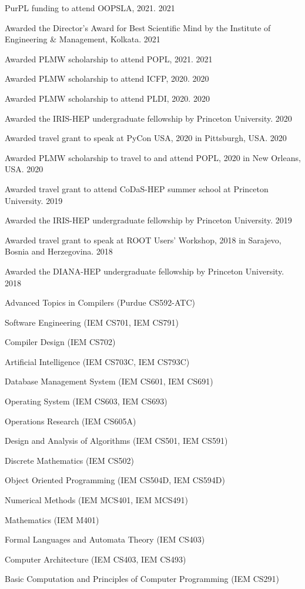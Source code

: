 \documentclass[10pt, letterpaper]{fulldeps}
\begin{document}
\newpage{}
%
%
\begin{tightitemize}
    \item PurPL funding to attend OOPSLA, 2021. \hfill{2021}
    \item Awarded the Director's Award for Best Scientific Mind by the Institute of Engineering \& Management, Kolkata. \hfill{2021}
    \item Awarded PLMW scholarship to attend POPL, 2021. \hfill{2021}
    \item Awarded PLMW scholarship to attend ICFP, 2020. \hfill{2020}
    \item Awarded PLMW scholarship to attend PLDI, 2020. \hfill{2020}
    \item Awarded the IRIS-HEP undergraduate fellowship by Princeton University. \hfill{2020}
    \item Awarded travel grant to speak at PyCon USA, 2020 in Pittsburgh, USA. \hfill{2020}
    \item Awarded PLMW scholarship to travel to and attend POPL, 2020 in New Orleans, USA. \hfill{2020}
    \item Awarded travel grant to attend CoDaS-HEP summer school at Princeton University. \hfill{2019}
    \item Awarded the IRIS-HEP undergraduate fellowship by Princeton University. \hfill{2019}
    \item Awarded travel grant to speak at ROOT Users' Workshop, 2018 in Sarajevo, Bosnia and Herzegovina. \hfill{2018}
	\item Awarded the DIANA-HEP undergraduate fellowship by Princeton University. \hfill{2018}
\end{tightitemize}

\begin{tightitemize}
\item Advanced Topics in Compilers (Purdue CS592-ATC)
\item Software Engineering (IEM CS701, IEM CS791)
\item Compiler Design (IEM CS702)
\item Artificial Intelligence (IEM CS703C, IEM CS793C)
\item Database Management System (IEM CS601, IEM CS691)
\item Operating System (IEM CS603, IEM CS693)
\item Operations Research (IEM CS605A)
\item Design and Analysis of Algorithms (IEM CS501, IEM CS591)
\item Discrete Mathematics (IEM CS502)
\item Object Oriented Programming (IEM CS504D, IEM CS594D)
\item Numerical Methods (IEM MCS401, IEM MCS491)
\item Mathematics (IEM M401)
\item Formal Languages and Automata Theory (IEM CS403)
\item Computer Architecture (IEM CS403, IEM CS493)
\item Basic Computation and Principles of Computer Programming (IEM CS291)
\end{tightitemize}
\end{document}
